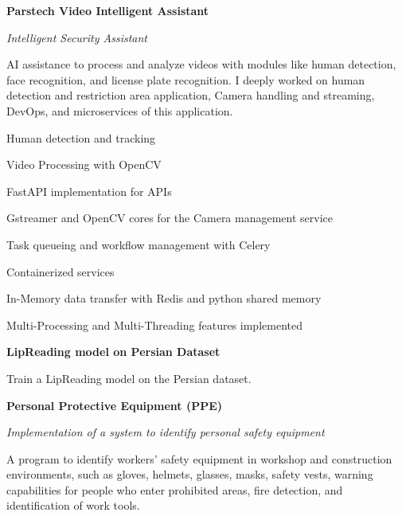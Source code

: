 \begin{rubric}{}

\entry*[2022 - present] \textbf{\Large Parstech Video Intelligent Assistant}
        \par \emph{\large Intelligent Security Assistant}
        \par AI assistance to process and analyze videos with modules like human detection, face recognition, and license plate recognition. I deeply worked on human detection and restriction area application, Camera handling and streaming, DevOps, and microservices of this application.

            \par \textbullet \hspace{1em} Human detection and tracking
            \par \textbullet \hspace{1em} Video Processing with OpenCV
            \par \textbullet \hspace{1em} FastAPI implementation for APIs
            \par \textbullet \hspace{1em} Gstreamer and OpenCV cores for the Camera management service

            \par \textbullet \hspace{1em} Task queueing and workflow management with Celery
            \par \textbullet \hspace{1em} Containerized services
            \par \textbullet \hspace{1em} In-Memory data transfer with Redis and python shared memory
            \par \textbullet \hspace{1em} Multi-Processing and Multi-Threading features implemented

        

\entry*[2022] \textbf{\Large LipReading model on Persian Dataset}  
        
        \par Train a LipReading model on the Persian dataset.

\entry*[2021] \textbf{\Large Personal Protective Equipment (PPE)} 
        \par \emph{Implementation of a system to identify personal safety equipment}
        \par A program to identify workers' safety equipment in workshop and construction environments, such as gloves, helmets, glasses, masks, safety vests, warning capabilities for people who enter prohibited areas, fire detection, and identification of work tools.


\end{rubric}
